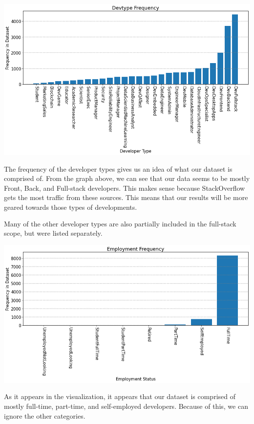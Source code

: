 \documentclass{report}
\begin{document}
\vspace{0.5in}

\includegraphics[width=0.9\linewidth]{frequencyDevtype.png}

\vspace{0.5in}

The frequency of the developer types gives us an idea of what our dataset is comprised of. From the graph above, we can see that our data seems to be mostly Front, Back, and Full-stack developers. This makes sense because StackOverflow gets the most traffic from these sources. This means that our results will be more geared towards those types of developments.

Many of the other developer types are also partially included in the full-stack scope, but were listed separately.

\vspace{0.5in}

\includegraphics[width=0.9\linewidth]{frequencyEmployment.png}

\vspace{0.5in}

As it appears in the visualization, it appears that our dataset is comprised of mostly full-time, part-time, and self-employed developers. Because of this, we can ignore the other categories.
\end{document}
